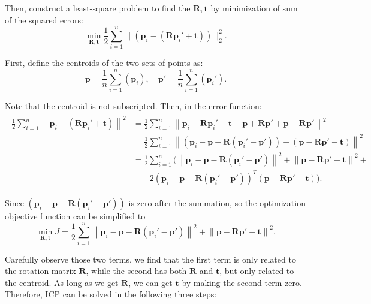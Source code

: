 Then, construct a least-square problem to find the $\bm{R}, \bm{t}$ by minimization of sum of the squared errors:
\begin{equation}
\mathop {\min }\limits_{\bm{R}, \bm{t}} \frac{1}{2} \sum\limits_{i = 1}^n\| {\left( {{\bm{p}_i} - \left( {\bm{R}{\bm{p}_i}' + \bm{t}} \right)} \right)} \|^2_2.
\end{equation}

First, define the centroids of the two sets of points as:
\begin{equation}
\bm{p} = \frac{1}{n}\sum_{i=1}^n ( \bm{p}_i ), \quad \bm{p}' = \frac{1}{n} \sum_{i=1}^n ( \bm{p}_i' ). 
\end{equation}

Note that the centroid is not subscripted. Then, in the error function:
\begin{align*}
\begin{array}{ll}
\frac{1}{2}\sum\limits_{i = 1}^n {{{\left\| {{\bm{p}_i} - \left( {\bm{R}{ \bm{p}_i}' + \bm{t}} \right)} \right\|}^2}}  & = \frac{1}{2}\sum\limits_{i = 1}^n {{{\left\| {{\bm{p}_i} - \bm{R}{\bm{p}_i}' - \bm{t} - \bm{p} + \bm{Rp}' + \bm{p} - \bm{Rp}'} \right\|}^2}} \\
 & = \frac{1}{2}\sum\limits_{i = 1}^n {{{\left\| {\left( {{\bm{p}_i} - \bm{p} - \bm{R}\left( {{\bm{p}_i}' - \bm{p}'} \right)} \right) + \left( {\bm{p} - \bm{Rp}' - \bm{t}} \right)} \right\|}^2}} \\
& = \frac{1}{2}\sum\limits_{i = 1}^n ( {{\left\| {{\bm{p}_i} - \bm{p} - \bm{R}\left( {{\bm{p}_i}' - \bm{p}'} \right)} \right\|}^2} + {{\left\| {\bm{p} - \bm{Rp}' - \bm{t}} \right\|}^2} +\\
 & \quad \quad 2{{\left( {{\bm{p}_i} - \bm{p} - \bm{R}\left( {{\bm{p}_i}' - \bm{p}'} \right)} \right)}^T}\left( {\bm{p} - \bm{Rp}' - \bm{t}} \right)). 
\end{array}
\end{align*}

Since $\left( {{\bm{p}_i} - \bm{p} - \bm{R}\left( {{\bm{p}_i}' - \bm{p}'} \right)} \right)$ is zero after the summation, so the optimization objective function can be simplified to
\begin{equation}
\mathop {\min }\limits_{\bm{R}, \bm{t}} J = \frac{1}{2}\sum\limits_{i = 1}^n {{\left\| {{\bm{p}_i} - \bm{p} - \bm{R}\left( {{\bm{p}_i}' - \bm{p}'} \right)} \right\|}^2} + {{\left\| {\bm{p} - \bm{Rp}' - \bm{t}} \right\|}^2} .
\end{equation}

Carefully observe those two terms, we find that the first term is only related to the rotation matrix $\bm{R}$, while the second has both $\bm{R}$ and $\bm{t}$, but only related to the centroid. As long as we get $\bm{R}$, we can get $\bm{t}$ by making the second term zero. Therefore, ICP can be solved in the following three steps:

